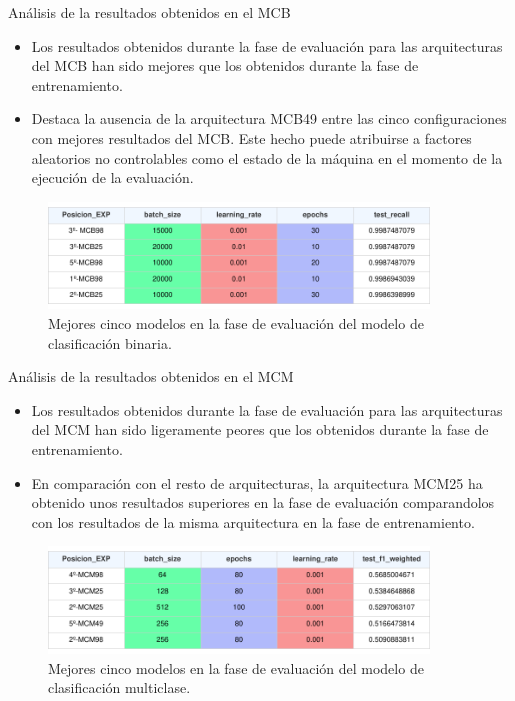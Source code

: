 \begin{frame}{Análisis de la resultados obtenidos en el MCB}
\begin{itemize}

	\item Los resultados obtenidos durante la fase de evaluación para las arquitecturas del MCB han sido mejores que los obtenidos durante la fase de entrenamiento.
	\item Destaca la ausencia de la arquitectura MCB49 entre las cinco configuraciones con mejores resultados del MCB. Este hecho puede atribuirse a factores aleatorios no controlables como el estado de la máquina en el momento de la ejecución de la evaluación.
\end{itemize}
	\begin{figure}[H]
    \centering
    \includegraphics[width=0.9\textwidth]{../Memoria/img/evaluacion/resultados/top5EVALMCB.pdf}
    \caption{Mejores cinco modelos en la fase de evaluación del modelo de clasificación binaria.}
    \label{fig:top5EVALMCB}
\end{figure}
\end{frame}


\begin{frame}{Análisis de la resultados obtenidos en el MCM}
\begin{itemize}

	\item Los resultados obtenidos durante la fase de evaluación para las arquitecturas del MCM han sido ligeramente peores que los obtenidos durante la fase de entrenamiento.
	\item En comparación con el resto de arquitecturas, la arquitectura MCM25 ha obtenido unos resultados superiores en la fase de evaluación comparandolos con los resultados de la misma arquitectura en la fase de entrenamiento.
\end{itemize}
	\begin{figure}[H]
    \centering
    \includegraphics[width=0.9\textwidth]{../Memoria/img/evaluacion/resultados/top5EVALMCM.pdf}
    \caption{Mejores cinco modelos en la fase de evaluación del modelo de clasificación multiclase.}
    \label{fig:top5EVALMCB}
\end{figure}
\end{frame}

